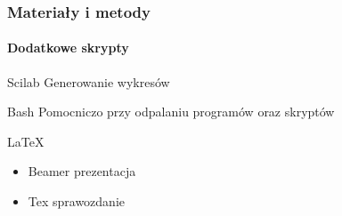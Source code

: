 \documentclass{beamer}
\begin{document}
\begin{frame}	
    \frametitle{Materiały i metody}
    \framesubtitle{Dodatkowe skrypty}
    \pause

    \begin{block}{Scilab}
        \pause
        Generowanie wykresów
    \end{block}

    \pause

    \begin{block}{Bash}
        \pause
        Pomocniczo przy odpalaniu programów oraz skryptów
    \end{block}

    \pause

    \begin{block}{\LaTeX}
        \pause
        \begin{itemize} [<+->]
            \item Beamer prezentacja	
            \item Tex sprawozdanie
        \end{itemize}
    \end{block}
\end{frame}
\end{document}
